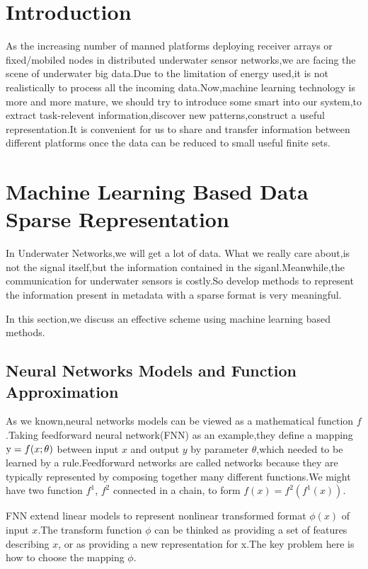 \section{Introduction}
As the increasing number of manned platforms deploying receiver arrays or  fixed/mobiled nodes in distributed underwater sensor networks,we are facing the scene of underwater big data.Due to the limitation of energy used,it is not realistically to process all the incoming data\cite{Yang2015Issues}.Now,machine learning technology is more and more mature, we should try to introduce some smart into our system,to extract task-relevent information,discover new patterns,construct a useful representation.It is convenient for us to share and transfer information between different platforms once the data can be reduced to small useful finite sets.

\section{Machine Learning Based Data Sparse Representation}
In Underwater Networks,we will get a lot of data. What we really care about,is not the signal itself,but the information contained in the siganl.Meanwhile,the communication for underwater sensors is costly.So develop methods to represent the information present in metadata with a sparse format is very meaningful.

In this section,we discuss an effective scheme using machine learning based methods.

\subsection{Neural Networks Models and Function Approximation}
As we known,neural networks models can be viewed as a mathematical function $f$.Taking feedforward neural network(FNN) as an example,they define a mapping ${\rm{y}}=f(x;\theta )$ between input $x$ and output $y$ by parameter $\theta$,which needed to be learned by a rule.Feedforward networks are called networks because they are typically represented by composing together many different functions.We might have two function $f^{1}$, $f^{2}$ connected in a chain\cite{goodfellow2016deep}, to form
$f(x) = f^{2}(f^{1}(x))$.

FNN extend linear models to represent nonlinear transformed format $\phi(x)$ of input $x$.The transform function $\phi$ can be thinked as providing a set of features describing $x$, or as providing a new representation for x.The key problem here is how to choose the mapping $\phi$.

